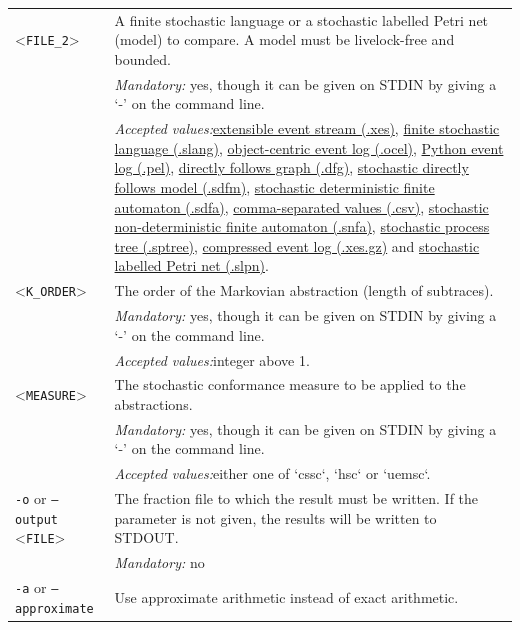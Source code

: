 {\begin{tabularx}{\linewidth}{lX}
<\texttt{FILE\_2}>&A finite stochastic language or a stochastic labelled Petri net (model) to compare. A model must be livelock-free and bounded.\\
&\textit{Mandatory:} \quad yes, though it can be given on STDIN by giving a `-' on the command line.\\
&\textit{Accepted values:}\quad \hyperref[filehandler:extensible event stream]{extensible event stream (.xes)}, \hyperref[filehandler:finite stochastic language]{finite stochastic language (.slang)}, \hyperref[filehandler:object-centric event log]{object-centric event log (.ocel)}, \hyperref[filehandler:Python event log]{Python event log (.pel)}, \hyperref[filehandler:directly follows graph]{directly follows graph (.dfg)}, \hyperref[filehandler:stochastic directly follows model]{stochastic directly follows model (.sdfm)}, \hyperref[filehandler:stochastic deterministic finite automaton]{stochastic deterministic finite automaton (.sdfa)}, \hyperref[filehandler:comma-separated values]{comma-separated values (.csv)}, \hyperref[filehandler:stochastic non-deterministic finite automaton]{stochastic non-deterministic finite automaton (.snfa)}, \hyperref[filehandler:stochastic process tree]{stochastic process tree (.sptree)}, \hyperref[filehandler:compressed event log]{compressed event log (.xes.gz)} and \hyperref[filehandler:stochastic labelled Petri net]{stochastic labelled Petri net (.slpn)}.\\
<\texttt{K\_ORDER}>&The order of the Markovian abstraction (length of subtraces).\\
&\textit{Mandatory:} \quad yes, though it can be given on STDIN by giving a `-' on the command line.\\
&\textit{Accepted values:}\quad integer above 1.\\
<\texttt{MEASURE}>&The stochastic conformance measure to be applied to the abstractions.\\
&\textit{Mandatory:} \quad yes, though it can be given on STDIN by giving a `-' on the command line.\\
&\textit{Accepted values:}\quad either one of `cssc`, `hsc` or `uemsc`.\\
\texttt{-o} or \texttt{--output} <\texttt{FILE}> &
The fraction file to which the result must be written. If the parameter is not given, the results will be written to STDOUT.\\
&\textit{Mandatory:} \quad no\\
\texttt{-a} or \texttt{--approximate} & Use approximate arithmetic instead of exact arithmetic.\\

\end{tabularx}}
